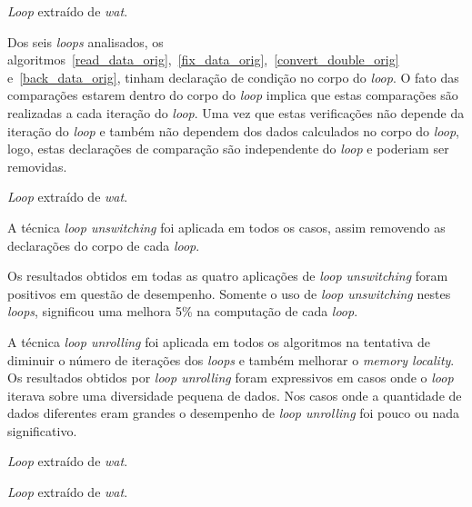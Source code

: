 \documentclass[12pt]{article}
\begin{document}
\begin{algorithm}[H]
  \caption{\textit{Loop} extraído de \textit{wat}.}
    \label{read_data_orig}

\end{algorithm}


Dos seis \textit{loops} analisados, os
algoritmos~\ref{read_data_orig},~\ref{fix_data_orig},~\ref{convert_double_orig}
e~\ref{back_data_orig}, tinham declaração de condição no corpo
do \textit{loop}.
O fato das comparações estarem dentro do corpo do \textit{loop} implica que
estas comparações são realizadas a cada iteração do \textit{loop}.
Uma vez que estas verificações não depende da iteração do \textit{loop} e também
não dependem dos dados calculados no corpo do \textit{loop}, logo, estas
declarações de comparação são independente do \textit{loop} e poderiam ser
removidas.

\begin{algorithm}[H]
  \caption{\textit{Loop} extraído de \textit{wat}.}
    \label{fix_data_orig}

\end{algorithm}


A técnica \textit{loop unswitching} foi aplicada em todos os casos, 
assim removendo as declarações do corpo de cada \textit{loop}. 

Os resultados obtidos em todas as quatro aplicações de \textit{loop unswitching} 
foram positivos em questão de desempenho. 
Somente o uso de \textit{loop unswitching} nestes \textit{loops}, significou uma
melhora 5\% na computação de cada \textit{loop}.

A técnica \textit{loop unrolling} foi aplicada em todos os algoritmos na
tentativa de diminuir o número de iterações dos \textit{loops} e também melhorar
o \textit{memory locality}. 
Os resultados obtidos por \textit{loop unrolling} foram expressivos em casos
onde o \textit{loop} iterava sobre uma diversidade pequena de dados.
Nos casos onde a quantidade de dados diferentes eram grandes
o desempenho de \textit{loop unrolling} foi pouco ou nada significativo.

\begin{algorithm}[H]
  \caption{\textit{Loop} extraído de \textit{wat}.}
    \label{convert_double_orig}

\end{algorithm}

\begin{algorithm}[H]
  \caption{\textit{Loop} extraído de \textit{wat}.}
    \label{save_file_orig}

\end{algorithm}
\end{document}
